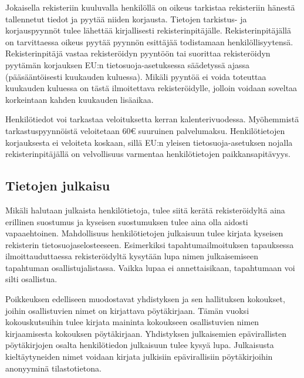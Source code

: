 \documentclass[finnish]{tktltiki}
\begin{document}
Jokaisella rekisteriin kuuluvalla henkilöllä on oikeus tarkistaa rekisteriin hänestä tallennetut tiedot ja pyytää niiden korjausta. Tietojen tarkistus- ja korjauspyynnöt tulee lähettää kirjallisesti rekisterinpitäjälle. Rekisterinpitäjällä on tarvittaessa oikeus pyytää pyynnön esittäjää todistamaan henkilöllisyytensä. Rekisterinpitäjä vastaa rekisteröidyn pyyntöön tai suorittaa rekisteröidyn pyytämän korjauksen EU:n tietosuoja-asetuksessa säädetyssä ajassa (pääsääntöisesti kuukauden kuluessa). Mikäli pyyntöä ei voida toteuttaa kuukauden kuluessa on tästä ilmoitettava rekisteröidylle, jolloin voidaan soveltaa korkeintaan kahden kuukauden lisäaikaa.

Henkilötiedot voi tarkastaa veloituksetta kerran kalenterivuodessa. Myöhemmistä tarkastuspyynnöistä veloitetaan 60€ suuruinen palvelumaksu. Henkilötietojen korjauksesta ei veloiteta koskaan, sillä EU:n yleisen tietosuoja-asetuksen nojalla rekisterinpitäjällä on velvollisuus varmentaa henkilötietojen paikkansapitävyys.


\subsection*{Tietojen julkaisu}

Mikäli halutaan julkaista henkilötietoja, tulee siitä kerätä rekisteröidyltä aina erillinen suostumus ja kyseisen suostumuksen tulee aina olla aidosti vapaaehtoinen. Mahdollisuus henkilötietojen julkaisuun tulee kirjata kyseisen rekisterin tietosuojaselosteeseen. Esimerkiksi tapahtumailmoituksen tapauksessa ilmoittauduttaessa rekisteröidyltä kysytään lupa nimen julkaisemiseen tapahtuman osallistujalistassa. Vaikka lupaa ei annettaisikaan, tapahtumaan voi silti osallistua.

Poikkeuksen edelliseen muodostavat yhdistyksen ja sen hallituksen kokoukset, joihin osallistuvien nimet on kirjattava pöytäkirjaan. Tämän vuoksi kokouskutsuihin tulee kirjata maininta kokoukseen osallistuvien nimen kirjaamisesta kokouksen pöytäkirjaan. Yhdistyksen julkaisemien epävirallisten pöytäkirjojen osalta henkilötiedon julkaisuun tulee kysyä lupa. Julkaisusta kieltäytyneiden nimet voidaan kirjata julkisiin epävirallisiin pöytäkirjoihin anonyyminä tilastotietona.
\end{document}
